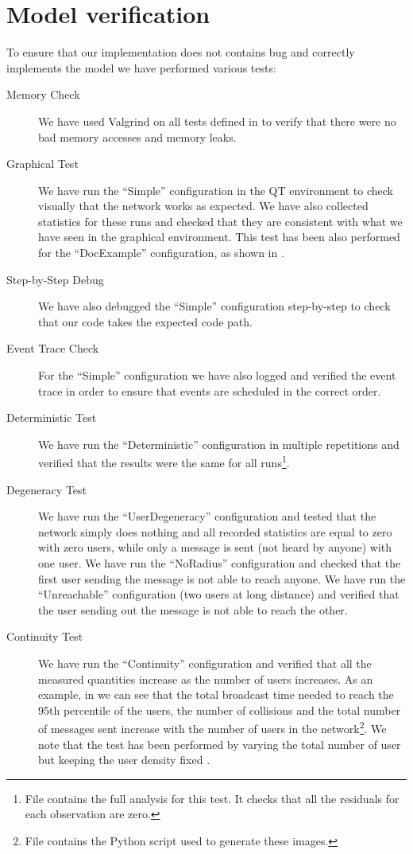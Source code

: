 \section{Model verification}\label{sec:verification}

To ensure that our implementation does not contains bug and correctly implements
the model we have performed various tests:
\begin{description}
	\item[Memory Check] We have used Valgrind on all tests defined in
		 to verify that there were no bad memory
		accesses and memory leaks.
	\item[Graphical Test] We have run the ``Simple'' configuration in the
		\omnetpp{} QT environment to check visually that the network
		works as expected. We have also collected statistics for these
		runs and checked that they are consistent with what we have seen
		in the graphical environment. This test has been also performed
		for the ``DocExample'' configuration, as shown in
		.
	\item[Step-by-Step Debug] We have also debugged the ``Simple''
		configuration step-by-step to check that our code takes the
		expected code path.
	\item[Event Trace Check] For the ``Simple'' configuration we have also
		logged and verified the event trace in order to ensure that
		events are scheduled in the correct order.  \item[Deterministic
		Test] We have run the ``Deterministic'' configuration in
		multiple repetitions and verified that the results were the same
		for all runs\footnote{File
		contains the full analysis for this test. It checks that all the
		residuals for each observation are zero.}.
	\item[Degeneracy Test] We have run the ``UserDegeneracy'' configuration
		and tested that the network simply does nothing and all recorded
		statistics are equal to zero with zero users, while only a
		message is sent (not heard by anyone) with one user. We have run
		the ``NoRadius'' configuration and checked that the first user
		sending the message is not able to reach anyone. We have run the
		``Unreachable'' configuration (two users at long distance) and
		verified that the user sending out the message is not able to
		reach the other.
	\item[Continuity Test] We have run the ``Continuity'' configuration and
		verified that all the measured quantities increase as the number
		of users increases. As an example, in  we
		can see that the total broadcast time needed to reach the 95th
		percentile of the users, the number of collisions and the total
		number of messages sent increase with the number of users in the
		network\footnote{File
		 contains
		the Python script used to generate these images.}. We note that
		the test has been performed by varying the total number of user
		but keeping the user density fixed .
\end{description}

